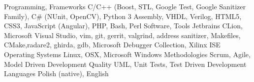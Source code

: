 

\begin{cvskills}

  \cvskill
    {Programming, Frameworks} %
    {C/C++ (Boost, STL, Google Test, Google Sanitizer Family), C\# (NUnit, OpenCV), Python 3 \newline
    Assembly, VHDL, Verilog, HTML5, CSS3, JavaScript (Angular), PHP, Bash, Perl} %
    \newline
  \cvskill
    {Software, Tools} %
    {Jetbrains CLion, Microsoft Visual Studio, vim, git, gerrit, valgrind, address sanitizer, Makefiles, CMake,\newline radare2, ghirda, gdb, Microsoft Debugger Collection, Xilinx ISE} %
    \newline
  \cvskill
    {Operating Systems}
    {Linux, OSX, Microsoft Windows}
  \cvskill
    {Methodologies}
    {Scrum, Agile, Model Driven Development}
  \cvskill
     {Quality}
     {UML, Unit Tests, Test Driven Development}
  \cvskill
    {Languages} %
    {Polish (native), English} %

\end{cvskills}
